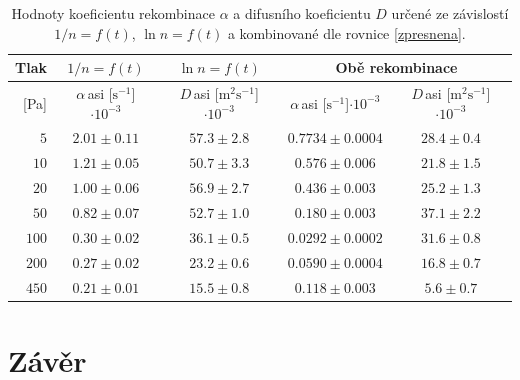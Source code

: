 \documentclass[a4paper,12pt]{article}
\begin{document}
\begin{table}[h]
	\caption{Hodnoty koeficientu rekombinace $\alpha$ a difusního koeficientu 
	$D$ určené ze závislostí $1/n = f(t)$, $\ln n = f(t)$ a kombinované dle 
	rovnice \eqref{zpresnena}.}
	\label{table:koef}
	\begin{tabular}{|r|c|c|c|c|}
		\hline
		Tlak    & $1/n = f(t)$      & $\ln n = f(t)$ & 
		\multicolumn{2}{c|}{Obě rekombinace}                                \\ 
		\hline
		{[}Pa{]} & 
		$\alpha$\,asi [$\si{\second^{-1}}$]$\cdot10^{-3}$ & 
		$D$\,asi 
		[$\si{\metre^2\second^{-1}}$]$\cdot10^{-3}$              & 
		$\alpha$\,asi [$\si{\second^{-1}}$]$\cdot10^{-3}$ & 
		$D$\,asi [$\si{\metre^2\second^{-1}}$]$\cdot10^{-3}$ \\ 
		\hline
		$5$                              &$ 2.01                 \pm 
		0.11                $&$ 57.3              \pm  2.8              $& 
		$0.7734    
		\pm 0.0004    $&$ 28.4       \pm  0.4       $\\ \hline
		$10$                             & $1.21                 \pm  
		0.05                $&$ 50.7              \pm  3.3              $&$ 
		0.576     
		\pm 0.006     $&$ 21.8       \pm  1.5       $\\ \hline
		$20                             $&$ 1.00                 \pm  
		0.06                $&$ 56.9              \pm  2.7              $&$ 
		0.436     
		\pm 0.003     $&$ 25.2       \pm  1.3       $\\ \hline
		$50                             $&$ 0.82                 \pm  
		0.07                $&$ 52.7              \pm  1.0              $&$ 
		0.180     
		\pm 0.003     $&$ 37.1       \pm  2.2       $\\ \hline
		$100                            $&$ 0.30                 \pm  
		0.02                $&$ 36.1              \pm  0.5              $& 
		$0.0292    
		\pm 0.0002    $&$ 31.6       \pm  0.8       $\\ \hline
		$200                            $&$ 0.27                 \pm  
		0.02                $&$ 23.2              \pm  0.6              $& 
		$0.0590    
		\pm 0.0004    $&$ 16.8       \pm  0.7       $\\ \hline
		$450                            $&$ 0.21                 \pm  
		0.01                $&$ 15.5              \pm  0.8              $& 
		$0.118     
		\pm 0.003     $&$ 5.6        \pm  0.7       $\\ \hline
	\end{tabular}
\end{table}
\clearpage
\section{Závěr}
\end{document}

